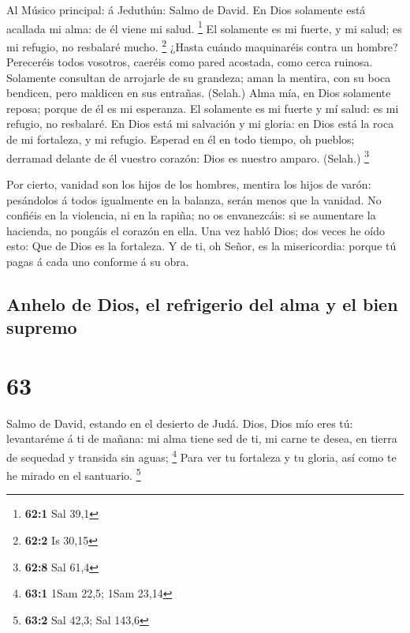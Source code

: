  Al Músico principal: á Jeduthún: Salmo de David. En Dios
solamente está acallada mi alma: de él viene mi salud. \footnote{\textbf{62:1}
  Sal 39,1}  El solamente es mi fuerte, y mi salud; es mi
refugio, no resbalaré mucho. \footnote{\textbf{62:2} Is 30,15}
 ¿Hasta cuándo maquinaréis contra un hombre? Pereceréis
todos vosotros, caeréis como pared acostada, como cerca ruinosa.
 Solamente consultan de arrojarle de su grandeza; aman la
mentira, con su boca bendicen, pero maldicen en sus entrañas. (Selah.)
 Alma mía, en Dios solamente reposa; porque de él es mi
esperanza.  El solamente es mi fuerte y mí salud: es mi
refugio, no resbalaré.  En Dios está mi salvación y mi
gloria: en Dios está la roca de mi fortaleza, y mi refugio. 
Esperad en él en todo tiempo, oh pueblos; derramad delante de él vuestro
corazón: Dios es nuestro amparo. (Selah.) \footnote{\textbf{62:8} Sal
  61,4}

 Por cierto, vanidad son los hijos de los hombres, mentira
los hijos de varón: pesándolos á todos igualmente en la balanza, serán
menos que la vanidad.  No confiéis en la violencia, ni en
la rapiña; no os envanezcáis: si se aumentare la hacienda, no pongáis el
corazón en ella.  Una vez habló Dios; dos veces he oído
esto: Que de Dios es la fortaleza.  Y de ti, oh Señor, es
la misericordia: porque tú pagas á cada uno conforme á su obra.

\hypertarget{anhelo-de-dios-el-refrigerio-del-alma-y-el-bien-supremo}{%
\subsection{Anhelo de Dios, el refrigerio del alma y el bien
supremo}\label{anhelo-de-dios-el-refrigerio-del-alma-y-el-bien-supremo}}

\hypertarget{section-62}{%
\section{63}\label{section-62}}

 Salmo de David, estando en el desierto de Judá. Dios, Dios
mío eres tú: levantaréme á ti de mañana: mi alma tiene sed de ti, mi
carne te desea, en tierra de sequedad y transida sin aguas; \footnote{\textbf{63:1}
  1Sam 22,5; 1Sam 23,14}  Para ver tu fortaleza y tu gloria,
así como te he mirado en el santuario. \footnote{\textbf{63:2} Sal 42,3;
  Sal 143,6}

